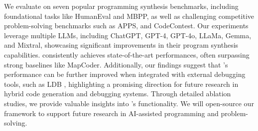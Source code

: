 







We evaluate \tool on seven popular programming synthesis benchmarks, including foundational tasks like HumanEval and MBPP, as well as challenging competitive problem-solving benchmarks such as APPS, and CodeContest. Our experiments leverage multiple LLMs, including ChatGPT, GPT-4, GPT-4o, LLaMa, Gemma, and Mixtral, showcasing significant improvements in their program synthesis capabilities. \tool consistently achieves state-of-the-art performances, often surpassing strong baselines like MapCoder. Additionally, our findings suggest that \toolnospace's performance can be further improved when integrated with external debugging tools, such as LDB \cite{zhong-etal-2024-debug}, highlighting a promising direction for future research in hybrid code generation and debugging systems. Through detailed ablation studies, we provide valuable insights into \toolnospace's functionality. We will open-source our framework to support future research in AI-assisted programming and problem-solving.


